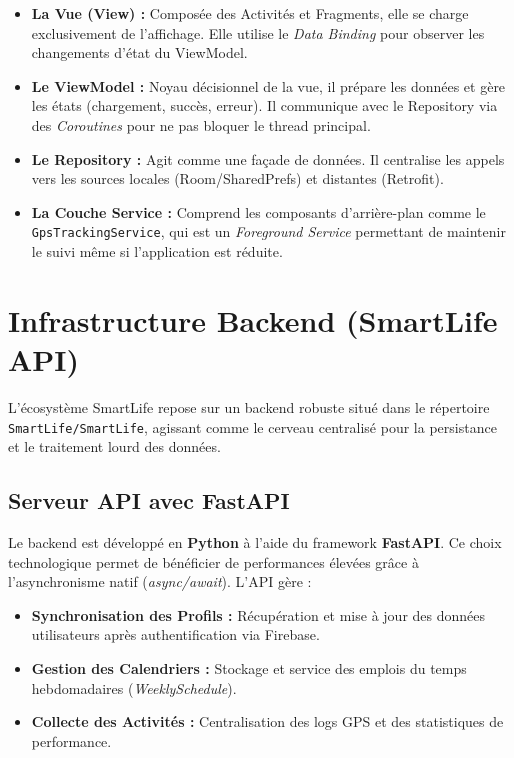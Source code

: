 \documentclass[12pt,a4paper,oneside]{report}
\begin{document}
\begin{itemize}
    \item \textbf{La Vue (View) :} Composée des Activités et Fragments, elle se charge exclusivement de l'affichage. Elle utilise le \textit{Data Binding} pour observer les changements d'état du ViewModel.
    \item \textbf{Le ViewModel :} Noyau décisionnel de la vue, il prépare les données et gère les états (chargement, succès, erreur). Il communique avec le Repository via des \textit{Coroutines} pour ne pas bloquer le thread principal.
    \item \textbf{Le Repository :} Agit comme une façade de données. Il centralise les appels vers les sources locales (Room/SharedPrefs) et distantes (Retrofit).
    \item \textbf{La Couche Service :} Comprend les composants d'arrière-plan comme le \texttt{GpsTrackingService}, qui est un \textit{Foreground Service} permettant de maintenir le suivi même si l'application est réduite.
\end{itemize}

\section{Infrastructure Backend (SmartLife API)}

L'écosystème SmartLife repose sur un backend robuste situé dans le répertoire \texttt{SmartLife/SmartLife}, agissant comme le cerveau centralisé pour la persistance et le traitement lourd des données.

\subsection{Serveur API avec FastAPI}
Le backend est développé en \textbf{Python} à l'aide du framework \textbf{FastAPI}. Ce choix technologique permet de bénéficier de performances élevées grâce à l'asynchronisme natif (\textit{async/await}). L'API gère :
\begin{itemize}
    \item \textbf{Synchronisation des Profils :} Récupération et mise à jour des données utilisateurs après authentification via Firebase.
    \item \textbf{Gestion des Calendriers :} Stockage et service des emplois du temps hebdomadaires (\textit{WeeklySchedule}).
    \item \textbf{Collecte des Activités :} Centralisation des logs GPS et des statistiques de performance.
\end{itemize}
\end{document}
